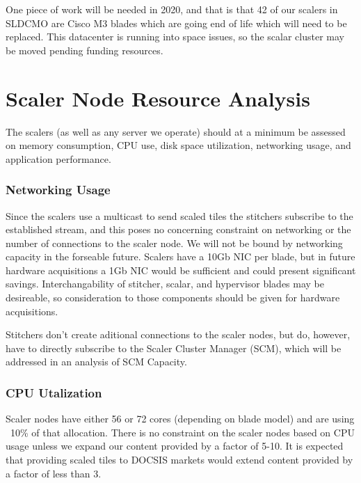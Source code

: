 \documentclass{article}
\begin{document}
One piece of work will be needed in 2020, and that is that 42 of our scalers in SLDCMO are Cisco M3 blades which are going end of life which will need to be replaced. This datacenter is running into space issues, so the scalar cluster may be moved pending funding resources. 



\section{Scaler Node Resource Analysis}
\label{SECTION-NODES}

The scalers (as well as any server we operate) should at a minimum be assessed on memory consumption, CPU use, disk space utilization, networking usage, and application performance. 

\subsubsection{Networking Usage}
\label{SECTION-Networking}

Since the scalers use a multicast to send scaled tiles the stitchers subscribe to the established stream, and this poses no concerning constraint on networking or the number of connections to the scaler node. We will not be bound by networking capacity in the forseable future. Scalers have a 10Gb NIC per blade, but in future hardware acquisitions a 1Gb NIC would be sufficient and could present significant savings. Interchangability of stitcher, scalar, and hypervisor blades may be desireable, so consideration to those components should be given for hardware acquisitions. 

Stitchers don't create aditional connections to the scaler nodes, but do, however, have to directly subscribe to the Scaler Cluster Manager (SCM), which will be addressed in an analysis of SCM Capacity.

\subsubsection{CPU Utalization}
\label{SECTION-CPUUse}

Scaler nodes have either 56 or 72 cores (depending on blade model) and are using ~10\% of that allocation. There is no constraint on the scaler nodes based on CPU usage unless we expand our content provided by a factor of 5-10. It is expected that providing scaled tiles to DOCSIS markets would extend content provided by a factor of less than 3. 
\end{document}
